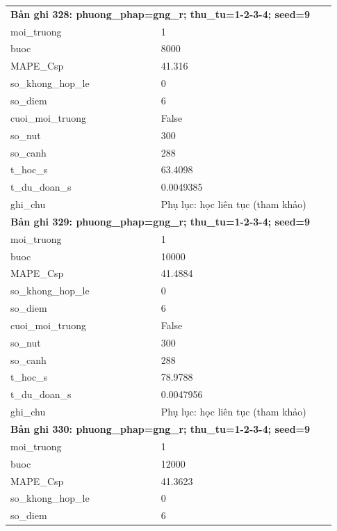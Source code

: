 \begin{longtable}{p{0.43\linewidth}p{0.50\linewidth}}
\midrule
\multicolumn{2}{p{0.95\linewidth}}{\textbf{Bản ghi 328: phuong\_phap=gng\_r; thu\_tu=1-2-3-4; seed=9}} \\
moi\_\allowbreak truong & 1 \\
buoc & 8000 \\
MAPE\_\allowbreak Csp & 41.316 \\
so\_\allowbreak khong\_\allowbreak hop\_\allowbreak le & 0 \\
so\_\allowbreak diem & 6 \\
cuoi\_\allowbreak moi\_\allowbreak truong & False \\
so\_\allowbreak nut & 300 \\
so\_\allowbreak canh & 288 \\
t\_\allowbreak hoc\_\allowbreak s & 63.4098 \\
t\_\allowbreak du\_\allowbreak doan\_\allowbreak s & 0.0049385 \\
ghi\_\allowbreak chu & Phụ lục: học liên tục (tham khảo) \\
\midrule
\multicolumn{2}{p{0.95\linewidth}}{\textbf{Bản ghi 329: phuong\_phap=gng\_r; thu\_tu=1-2-3-4; seed=9}} \\
moi\_\allowbreak truong & 1 \\
buoc & 10000 \\
MAPE\_\allowbreak Csp & 41.4884 \\
so\_\allowbreak khong\_\allowbreak hop\_\allowbreak le & 0 \\
so\_\allowbreak diem & 6 \\
cuoi\_\allowbreak moi\_\allowbreak truong & False \\
so\_\allowbreak nut & 300 \\
so\_\allowbreak canh & 288 \\
t\_\allowbreak hoc\_\allowbreak s & 78.9788 \\
t\_\allowbreak du\_\allowbreak doan\_\allowbreak s & 0.0047956 \\
ghi\_\allowbreak chu & Phụ lục: học liên tục (tham khảo) \\
\midrule
\multicolumn{2}{p{0.95\linewidth}}{\textbf{Bản ghi 330: phuong\_phap=gng\_r; thu\_tu=1-2-3-4; seed=9}} \\
moi\_\allowbreak truong & 1 \\
buoc & 12000 \\
MAPE\_\allowbreak Csp & 41.3623 \\
so\_\allowbreak khong\_\allowbreak hop\_\allowbreak le & 0 \\
so\_\allowbreak diem & 6 \\

\end{longtable}
